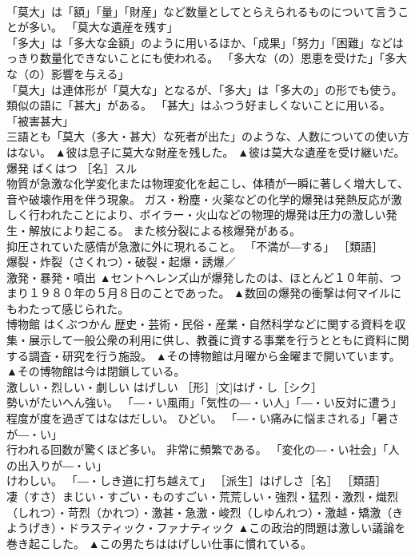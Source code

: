 \documentclass[8pt]{extreport}
\begin{document}
\begin{CJK}{UTF8}{min}
\\	「莫大」は「額」「量」「財産」など数量としてとらえられるものについて言うことが多い。 「莫大な遺産を残す」
\\	「多大」は「多大な金額」のように用いるほか、「成果」「努力」「困難」などはっきり数量化できないことにも使われる。 「多大な（の）恩恵を受けた」「多大な（の）影響を与える」
\\	「莫大」は連体形が「莫大な」となるが、「多大」は「多大の」の形でも使う。 
\\	類似の語に「甚大」がある。 「甚大」はふつう好ましくないことに用いる。 「被害甚大」
\\	三語とも「莫大（多大・甚大）な死者が出た」のような、人数についての使い方はない。	▲彼は息子に莫大な財産を残した。 ▲彼は莫大な遺産を受け継いだ。
\\	爆発	ばくはつ	［名］スル 
\\	物質が急激な化学変化または物理変化を起こし、体積が一瞬に著しく増大して、音や破壊作用を伴う現象。 ガス・粉塵・火薬などの化学的爆発は発熱反応が激しく行われたことにより、ボイラー・火山などの物理的爆発は圧力の激しい発生・解放により起こる。 また核分裂による核爆発がある。 
\\	抑圧されていた感情が急激に外に現れること。 「不満が―する」 ［類語］
\\	爆裂・炸裂（さくれつ）・破裂・起爆・誘爆／
\\	激発・暴発・噴出	▲セントヘレンズ山が爆発したのは、ほとんど１０年前、つまり１９８０年の５月８日のことであった。 ▲数回の爆発の衝撃は何マイルにもわたって感じられた。
\\	博物館	はくぶつかん	歴史・芸術・民俗・産業・自然科学などに関する資料を収集・展示して一般公衆の利用に供し、教養に資する事業を行うとともに資料に関する調査・研究を行う施設。	▲その博物館は月曜から金曜まで開いています。 ▲その博物館は今は閉鎖している。
\\	激しい・烈しい・劇しい	はげしい	［形］[文]はげ・し［シク］ 
\\	勢いがたいへん強い。 「―・い風雨」「気性の―・い人」「―・い反対に遭う」 
\\	程度が度を過ぎてはなはだしい。 ひどい。 「―・い痛みに悩まされる」「暑さが―・い」 
\\	行われる回数が驚くほど多い。 非常に頻繁である。 「変化の―・い社会」「人の出入りが―・い」 
\\	けわしい。 「―・しき道に打ち越えて」 ［派生］はげしさ［名］ ［類語］
\\	凄（すさ）まじい・すごい・ものすごい・荒荒しい・強烈・猛烈・激烈・熾烈（しれつ）・苛烈（かれつ）・激甚・急激・峻烈（しゆんれつ）・激越・矯激（きようげき）・ドラスティック・ファナティック	▲この政治的問題は激しい議論を巻き起こした。 ▲この男たちははげしい仕事に慣れている。

\end{CJK}
\end{document}
